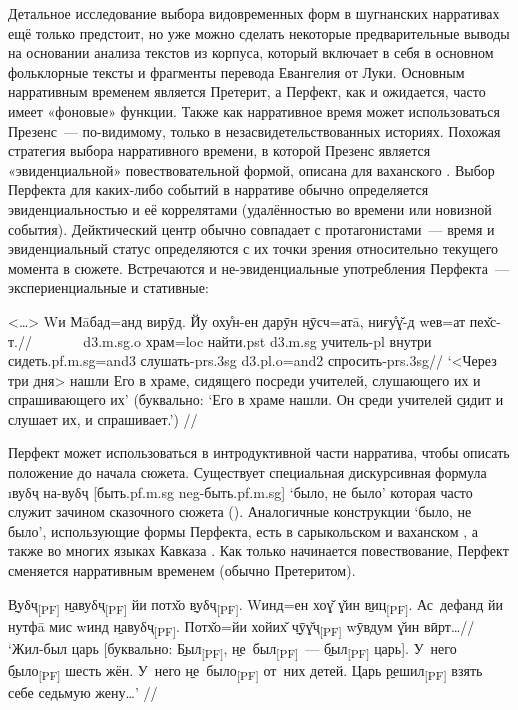 {{{Детальное исследование выбора видовременных форм в шугнанских нарративах ещё только предстоит, но уже можно сделать некоторые предварительные выводы на основании анализа текстов из корпуса, который включает в себя в основном фольклорные тексты и фрагменты перевода Евангелия от Луки. Основным нарративным временем является Претерит, а Перфект, как и ожидается, часто имеет «фоновые» функции. Также как нарративное время может использоваться Презенс~— по-видимому, только в незасвидетельствованных историях. Похожая стратегия выбора нарративного времени, в которой Презенс является «эвиденциальной» повествовательной формой, описана для ваханского \parencite[53–63]{obrtelova2019_text}. Выбор Перфекта для каких-либо событий в нарративе обычно определяется эвиденциальностью и её коррелятами (удалённостью во времени или новизной события). Дейктический центр обычно совпадает с протагонистами~— время и эвиденциальный статус определяются с их точки зрения относительно текущего момента в сюжете. Встречаются и не-эвиденциальные употребления Перфекта~— экспериенциальные и стативные:

\begingl
\gla <…> Wи Мāбад=анд вирӯд. Йу оху̊н-ен дарӯн \b{нӯсч}=атā, ниғу̊ɣ̌-д wев=ат пех̌с-т.//
\glc ~~~~~~ {\sc d3.m.sg.o} храм={\sc loc} найти.{\sc pst} {\sc d3.m.sg} учитель-{\sc pl} внутри сидеть.{\sc pf.m.sg=and3} слушать-{\sc prs.3sg} {\sc d3.pl.o=and2} спросить-{\sc prs.3sg}//
\glft ‘<Через три дня> нашли Его в храме, сидящего посреди учителей, слушающего их и спрашивающего их’ (буквально: ‘Его в храме нашли. Он среди учителей \b{сидит} и слушает их, и спрашивает.’) //
\endgl \xe

Перфект может использоваться в интродуктивной части нарратива, чтобы описать положение до начала сюжета. Существует специальная дискурсивная формула \i{вуδҷ на-вуδҷ} [быть.{\sc pf.m.sg} {\sc neg}-быть.{\sc pf.m.sg}] ‘было, не было’ которая часто служит зачином сказочного сюжета (). Аналогичные конструкции ‘было, не было’, использующие формы Перфекта, есть в сарыкольском \parencite[98]{palmer2016} и ваханском \parencite[29]{obrtelova2017}, а также во многих языках Кавказа \parencite[341]{maisak2016}. Как только начинается повествование, Перфект сменяется нарративным временем (обычно Претеритом).

\begingl
\gla \b{Вуδҷ}\textsubscript{[PF]} \b{навуδҷ}\textsubscript{[PF]} йи потх̌о \b{вуδҷ}\textsubscript{[PF]}. Wинд=ен хоɣ̌ ɣ̌ин \b{виц}\textsubscript{[PF]}. Ас~дефанд йи нутфā мис wинд \b{навуδҷ}\textsubscript{[PF]}. Потх̌о=йи хойих̌ \b{чӯɣ̌ҷ}\textsubscript{[PF]} wӯвдум ɣ̌ин вӣрт…//
\glft ‘Жил-был царь [буквально: \b{Был}\textsubscript{[PF]}, \b{не~был}\textsubscript{[PF]}~— \b{был}\textsubscript{[PF]} царь]. У~него \b{было}\textsubscript{[PF]} шесть жён. У~него \b{не~было}\textsubscript{[PF]} от~них детей. Царь \b{решил}\textsubscript{[PF]} взять себе седьмую жену…’ //
\endgl \xe

}}}
